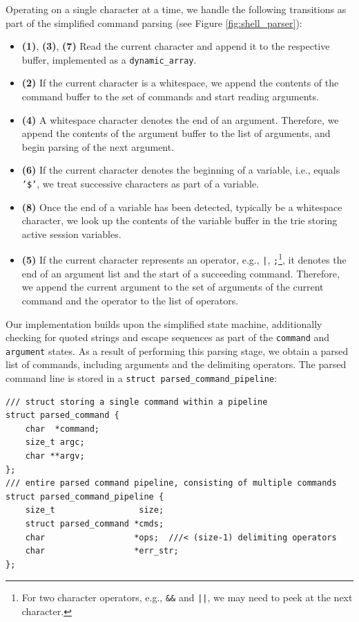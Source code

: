 Operating on a single character at a time, we handle the following transitions as part of the simplified command parsing (see Figure \ref{fig:shell_parser}):
\begin{itemize}
	\item \textbf{(1)}, \textbf{(3)}, \textbf{(7)} Read the current character and append it to the respective buffer, implemented as a \texttt{dynamic\_array}.
	\item \textbf{(2)} If the current character is a whitespace, we append the contents of the command buffer to the set of commands and start reading arguments.
	\item \textbf{(4)} A whitespace character denotes the end of an argument. Therefore, we append the contents of the argument buffer to the list of arguments, and begin parsing of the next argument.
	\item \textbf{(6)} If the current character denotes the beginning of a variable, i.e., equals \texttt{'\$'}, we treat successive characters as part of a variable.
	\item \textbf{(8)} Once the end of a variable has been detected, typically be a whitespace character, we look up the contents of the variable buffer in the trie storing active session variables.
	\item \textbf{(5)} If the current character represents an operator, e.g., \texttt{|}, \texttt{;}\footnote{For two character operators, e.g., \texttt{\&\&} and \texttt{||}, we may need to peek at the next character.}, it denotes the end of an argument list and the start of a succeeding command. Therefore, we append the current argument to the set of arguments of the current command and the operator to the list of operators.
\end{itemize}


Our implementation builds upon the simplified state machine, additionally checking for quoted strings and escape sequences as part of the \texttt{command} and \texttt{argument} states. As a result of performing this parsing stage, we obtain a parsed list of commands, including arguments and the delimiting operators. The parsed command line is stored in a \texttt{struct parsed\_command\_pipeline}:

\begin{lstlisting}[caption={Shell: Enabling Command History via the \texttt{history\_item} struct},label={listing:shell_parsed_cmd_pipeline}]
/// struct storing a single command within a pipeline
struct parsed_command {
    char  *command;
    size_t argc;
    char **argv;
};
/// entire parsed command pipeline, consisting of multiple commands
struct parsed_command_pipeline {
    size_t                 size;
    struct parsed_command *cmds;
    char                  *ops;  ///< (size-1) delimiting operators
    char                  *err_str;
};
\end{lstlisting}

